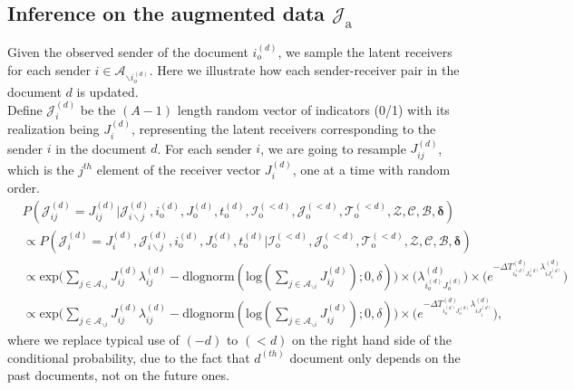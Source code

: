 \documentclass[a4paper]{article}
\begin{document}
  \subsection{Inference on the augmented data $\mathcal{J}_{\mbox{a}}$}
     Given the observed sender of the document $i_o^{(d)}$, we sample the latent receivers for each sender $i \in \mathcal{A}_{\backslash i_o^{(d)}}$. Here we illustrate how each sender-receiver pair in the document $d$ is updated.\\\newline
       Define ${\mathcal{J}}^{(d)}_{i}$ be the $(A-1)$ length random vector of indicators (0/1) with its realization being $J^{(d)}_{i}$, representing the latent receivers corresponding to the sender $i$ in the document $d$. For each sender $i$, we are going to resample ${J}^{(d)}_{ij}$, which is the $j^{th}$ element of the receiver vector ${J}^{(d)}_{i}$, one at a time with random order. \\
       \begin{equation}
       \begin{aligned}
       &P(\mathcal{J}^{(d)}_{ij} = {J}^{(d)}_{ij}|\mathcal{J}^{(d)}_{i\backslash j}, i^{(d)}_{\mbox{o}}, J^{(d)}_{\mbox{o}}, t^{(d)}_{\mbox{o}}, \mathcal{I}^{(<d)}_{\mbox{o}}, \mathcal{J}^{(<d)}_{\mbox{o}}, \mathcal{T}^{(<d)}_{\mbox{o}}, \mathcal{Z}, \mathcal{C}, \mathcal{B}, \boldsymbol{\delta})\\&\propto P(\mathcal{J}^{(d)}_{i} ={J}^{(d)}_{i}, \mathcal{J}^{(d)}_{i\backslash j}, i^{(d)}_{\mbox{o}}, J^{(d)}_{\mbox{o}}, t^{(d)}_{\mbox{o}}| \mathcal{I}^{(<d)}_{\mbox{o}}, \mathcal{J}^{(<d)}_{\mbox{o}}, \mathcal{T}^{(<d)}_{\mbox{o}}, \mathcal{Z}, \mathcal{C}, \mathcal{B}, \boldsymbol{\delta})
       \\&\propto \mbox{exp}\Big(\sum_{j \in \mathcal{A}_{\backslash i}}J^{(d)}_{ij}\lambda^{(d)}_{ij} - \mbox{dlognorm}(\mbox{log}(\sum\limits_{j \in \mathcal{A}_{\backslash i}}J^{(d)}_{ij});0, \delta)\Big)\times \Big(\lambda^{(d)}_{i_o^{(d)}J_{o}^{(d)}}\Big)\times  \Big(e^{-\Delta T^{(d)}_{i_o^{(d)}J_o^{(d)}}\lambda^{(d)}_{iJ^{(d)}_{i}}}\Big)
       \\& \propto \mbox{exp}\Big(\sum_{j \in \mathcal{A}_{\backslash i}}J^{(d)}_{ij}\lambda^{(d)}_{ij} - \mbox{dlognorm}(\mbox{log}(\sum\limits_{j \in \mathcal{A}_{\backslash i}}J^{(d)}_{ij});0, \delta)\Big)\times \Big(e^{-\Delta T^{(d)}_{i_o^{(d)}J_o^{(d)}}\lambda^{(d)}_{iJ^{(d)}_{i}}}\Big),
       \end{aligned}
       \end{equation}
       where we replace typical use of $(-d)$ to $(<d)$ on the right hand side of the conditional probability, due to the fact that $d^{(th)}$ document only depends on the past documents, not on the future ones.\\ \newline
\end{document}
